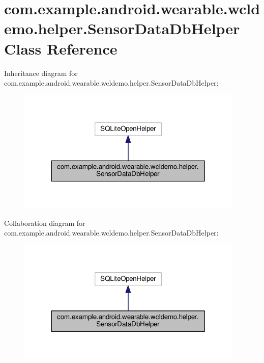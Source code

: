 \hypertarget{classcom_1_1example_1_1android_1_1wearable_1_1wcldemo_1_1helper_1_1SensorDataDbHelper}{}\section{com.\+example.\+android.\+wearable.\+wcldemo.\+helper.\+Sensor\+Data\+Db\+Helper Class Reference}
\label{classcom_1_1example_1_1android_1_1wearable_1_1wcldemo_1_1helper_1_1SensorDataDbHelper}


Inheritance diagram for com.\+example.\+android.\+wearable.\+wcldemo.\+helper.\+Sensor\+Data\+Db\+Helper\+:
\nopagebreak
\begin{figure}[H]
\begin{center}
\leavevmode
\includegraphics[width=306pt]{d7/df3/classcom_1_1example_1_1android_1_1wearable_1_1wcldemo_1_1helper_1_1SensorDataDbHelper__inherit__graph}
\end{center}
\end{figure}


Collaboration diagram for com.\+example.\+android.\+wearable.\+wcldemo.\+helper.\+Sensor\+Data\+Db\+Helper\+:
\nopagebreak
\begin{figure}[H]
\begin{center}
\leavevmode
\includegraphics[width=306pt]{d6/d87/classcom_1_1example_1_1android_1_1wearable_1_1wcldemo_1_1helper_1_1SensorDataDbHelper__coll__graph}
\end{center}
\end{figure}

